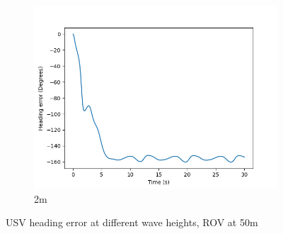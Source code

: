 \documentclass[class=article, crop=false]{standalone}
\begin{document}
\begin{figure}
\begin{subfigure}[b]{0.48\textwidth}
        \includegraphics{scenario1/rov-50m/2.0m/usv_heading_error_uncontrolled}
        \caption{2m}
        \label{}
    \end{subfigure}

    \caption{USV heading error at different wave heights, ROV at 50m}
\end{figure}
\end{document}
